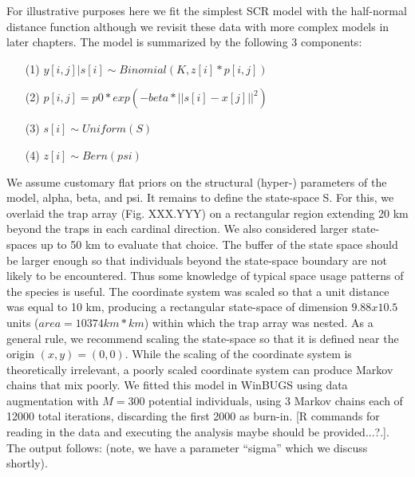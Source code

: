 For illustrative purposes here we fit the simplest SCR model with the half-normal distance function although we revisit these data with more complex models in later chapters. The model is summarized by the following 3 components: 
\begin{itemize}
\item[(1)] $y[i,j]|s[i] \sim Binomial(K, z[i]*p[i,j])$
\item[(2)] $p[i,j] = p0*exp(-beta*||s[i]-x[j]||^2)$
\item[(3)] $ s[i] \sim Uniform(S)$
\item[(4)] $ z[i] \sim Bern(psi)	$
\end{itemize}		
We assume customary flat priors on the structural (hyper-) parameters of the model, alpha, beta, and psi.  It remains to define the state-space S. For this, we overlaid the trap array (Fig. XXX.YYY) on a rectangular region extending 20 km beyond the traps in each cardinal direction.  We also considered larger state-spaces up to 50 km to evaluate that choice.
The buffer of the state space should be larger enough so that individuals beyond the state-space boundary are not likely to be encountered. Thus some knowledge of typical space usage patterns of the species is useful.
The coordinate system was scaled so that a unit distance was equal to 10 km, producing a rectangular state-space of dimension $9.88 x 10.5$ units ($area = 10374 km*km$) within which the trap array was nested. As a general rule, we recommend scaling the state-space so that it is defined near the origin $(x,y)=(0,0)$. While the scaling of the coordinate system is theoretically irrelevant, a poorly scaled coordinate system can produce Markov chains that mix poorly.  
We fitted this model in WinBUGS using data augmentation with $M=300$ potential individuals, using 3 Markov chains each of 12000 total iterations, discarding the first 2000 as burn-in.  [R commands for reading in the data and executing the analysis maybe should be provided...?.]. The output follows: (note, we have a parameter ``sigma'' which we discuss shortly).

